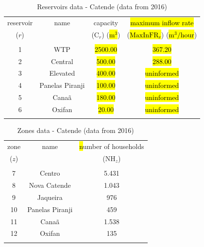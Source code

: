 \documentclass{singlecol}
\theoremstyle{TH}{
\newtheorem{lemma}{Lemma}
\newtheorem{theorem}[lemma]{Theorem}
\newtheorem{corrolary}[lemma]{Corrolary}
\newtheorem{conjecture}[lemma]{Conjecture}
\newtheorem{proposition}[lemma]{Proposition}
\newtheorem{claim}[lemma]{Claim}
\newtheorem{stheorem}[lemma]{Wrong Theorem}
\newtheorem{algorithm}{Algorithm}
}
\theoremstyle{THrm}{
\newtheorem{definition}{Definition}[section]
\newtheorem{question}{Question}[section]
\newtheorem{remark}{Remark}
\newtheorem{scheme}{Scheme}
}
\theoremstyle{THhit}{
\newtheorem{case}{Case}[section]
}
\begin{document}
\begin{table}[H]
\begin{center}
	\begin{tabular}{ c  c  c  c } 
		reservoir      & name              & capacity                       & \hl{maximum inflow rate}    \\
		($r$)          &             	   &  ($\mathrm{C}_{r}$) (\hl{$\mathrm{m^3}$})    &  (\hl{$\mathrm{MaxInFR}_{r}$}) (\hl{$\mathrm{m^3/hour}$}) \\
		\\
		1              & WTP                &   \hl{2500.00}            &  \hl{367.20}   \\
		2              & Central             &   \hl{500.00} 		&  \hl{288.00}   \\
		3              & Elevated           &   \hl{400.00}           & \hl{uninformed} \\
		4              & Panelas Piranji  &   \hl{100.00}           & \hl{uninformed} \\
		5              & Canaã              &   \hl{180.00}           & \hl{uninformed} \\
		6              & Oxifan              &   \hl{20.00}            & \hl{uninformed} \\
		\\
	\end{tabular}
\caption{Reservoirs data - Catende (data from 2016)}
\label{tab:reservoirsCatende}
\end{center}
\end{table}

\begin{table}[H]
\begin{center}
	\begin{tabular}{ c  c  c } 
		zone          & name         & \hl{n}umber of households \\
		($z$)          &              & ($\mathrm{NH}_{z}$)   \\
		                                               \\
		7              & Centro           & 5.431 \\
		8              & Nova Catende     & 1.043 \\
		9              & Jaqueira         &   976 \\
	   10              & Panelas Piranji  &   459 \\
	   11              & Canaã            & 1.538 \\
	   12              & Oxifan           &   135 \\
	   \\
	\end{tabular}
\caption{Zones data - Catende (data from 2016)}
\label{tab:zonesCatende}
\end{center}
\end{table}
\end{document}
